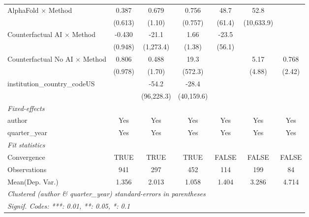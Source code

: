 \begin{tabular}{lcccccc}
   AlphaFold $\times$ Method             & 0.387       & 0.679       & 0.756       & 48.7          & 52.8        &   \\   
                                         & (0.613)     & (1.10)      & (0.757)     & (61.4)        & (10,633.9)  &   \\   
   Counterfactual AI $\times$ Method     & -0.430      & -21.1       & 1.66        & -23.5         &             &   \\   
                                         & (0.948)     & (1,273.4)   & (1.38)      & (56.1)        &             &   \\   
   Counterfactual No AI $\times$ Method  & 0.806       & 0.488       & 19.3        &               & 5.17        & 0.768\\   
                                         & (0.978)     & (1.70)      & (572.3)     &               & (4.88)      & (2.42)\\   
   institution\_country\_codeUS          &             & -54.2       & -28.4       &               &             &   \\   
                                         &             & (96,228.3)  & (40,159.6)  &               &             &   \\   
   \midrule
   \emph{Fixed-effects}\\
   author                                & Yes         & Yes         & Yes         & Yes           & Yes         & Yes\\  
   quarter\_year                         & Yes         & Yes         & Yes         & Yes           & Yes         & Yes\\  
   \midrule
   \emph{Fit statistics}\\
   Convergence                           &TRUE         & TRUE        & TRUE        & FALSE         & FALSE       & FALSE\\  
   Observations                          & 941         & 297         & 452         & 114           & 199         & 84\\  
Mean(Dep. Var.) & 1.356 & 2.013 & 1.058 & 1.404 & 3.286 & 4.714 \\
   \midrule \midrule
   \multicolumn{7}{l}{\emph{Clustered (author \& quarter\_year) standard-errors in parentheses}}\\
   \multicolumn{7}{l}{\emph{Signif. Codes: ***: 0.01, **: 0.05, *: 0.1}}\\
\end{tabular}
\par\endgroup
